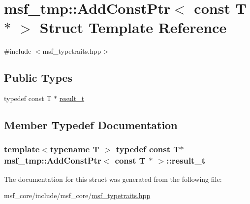 \hypertarget{structmsf__tmp_1_1AddConstPtr_3_01const_01T_01_5_01_4}{\section{msf\-\_\-tmp\-:\-:Add\-Const\-Ptr$<$ const T $\ast$ $>$ Struct Template Reference}
\label{structmsf__tmp_1_1AddConstPtr_3_01const_01T_01_5_01_4}
}


{\ttfamily \#include $<$msf\-\_\-typetraits.\-hpp$>$}

\subsection*{Public Types}
\begin{DoxyCompactItemize}
\item 
typedef const T $\ast$ \hyperlink{structmsf__tmp_1_1AddConstPtr_3_01const_01T_01_5_01_4_a8f8af888c4ff5b522236b9cec4b3b2f6}{result\-\_\-t}
\end{DoxyCompactItemize}


\subsection{Member Typedef Documentation}
\hypertarget{structmsf__tmp_1_1AddConstPtr_3_01const_01T_01_5_01_4_a8f8af888c4ff5b522236b9cec4b3b2f6}{
\subsubsection[{result\-\_\-t}]{\setlength{\rightskip}{0pt plus 5cm}template$<$typename T $>$ typedef const T$\ast$ {\bf msf\-\_\-tmp\-::\-Add\-Const\-Ptr}$<$ const T $\ast$ $>$\-::{\bf result\-\_\-t}}}\label{structmsf__tmp_1_1AddConstPtr_3_01const_01T_01_5_01_4_a8f8af888c4ff5b522236b9cec4b3b2f6}


The documentation for this struct was generated from the following file\-:\begin{DoxyCompactItemize}
\item 
msf\-\_\-core/include/msf\-\_\-core/\hyperlink{msf__typetraits_8hpp}{msf\-\_\-typetraits.\-hpp}\end{DoxyCompactItemize}
